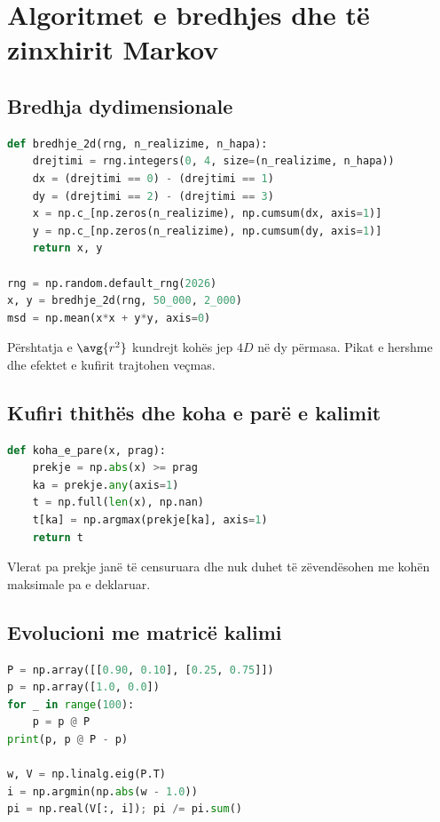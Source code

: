 \section{Algoritmet e bredhjes dhe të zinxhirit Markov}
\subsection{Bredhja dydimensionale}
\begin{lstlisting}[language=Python,caption={Shumë realizime të bredhjes në 2D.}]
def bredhje_2d(rng, n_realizime, n_hapa):
    drejtimi = rng.integers(0, 4, size=(n_realizime, n_hapa))
    dx = (drejtimi == 0) - (drejtimi == 1)
    dy = (drejtimi == 2) - (drejtimi == 3)
    x = np.c_[np.zeros(n_realizime), np.cumsum(dx, axis=1)]
    y = np.c_[np.zeros(n_realizime), np.cumsum(dy, axis=1)]
    return x, y

rng = np.random.default_rng(2026)
x, y = bredhje_2d(rng, 50_000, 2_000)
msd = np.mean(x*x + y*y, axis=0)
\end{lstlisting}
Përshtatja e $\avg{r^2}$ kundrejt kohës jep $4D$ në dy përmasa. Pikat e hershme dhe efektet e kufirit trajtohen veçmas.

\subsection{Kufiri thithës dhe koha e parë e kalimit}
\begin{lstlisting}[language=Python]
def koha_e_pare(x, prag):
    prekje = np.abs(x) >= prag
    ka = prekje.any(axis=1)
    t = np.full(len(x), np.nan)
    t[ka] = np.argmax(prekje[ka], axis=1)
    return t
\end{lstlisting}
Vlerat pa prekje janë të censuruara dhe nuk duhet të zëvendësohen me kohën maksimale pa e deklaruar.

\subsection{Evolucioni me matricë kalimi}
\begin{lstlisting}[language=Python,caption={Shpërndarja stacionare e një zinxhiri të fundmë.}]
P = np.array([[0.90, 0.10], [0.25, 0.75]])
p = np.array([1.0, 0.0])
for _ in range(100):
    p = p @ P
print(p, p @ P - p)

w, V = np.linalg.eig(P.T)
i = np.argmin(np.abs(w - 1.0))
pi = np.real(V[:, i]); pi /= pi.sum()
\end{lstlisting}

